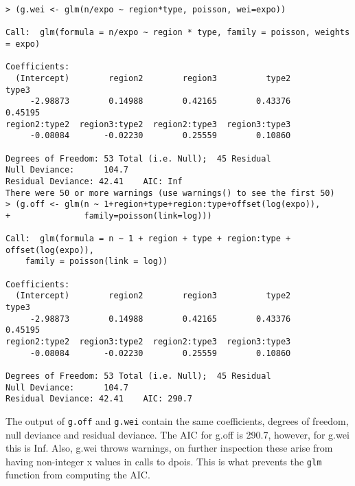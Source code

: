 \documentclass[11pt]{article}
\begin{document}
\begin{verbatim}
> (g.wei <- glm(n/expo ~ region*type, poisson, wei=expo))

Call:  glm(formula = n/expo ~ region * type, family = poisson, weights = expo)

Coefficients:
  (Intercept)        region2        region3          type2          type3
     -2.98873        0.14988        0.42165        0.43376        0.45195
region2:type2  region3:type2  region2:type3  region3:type3  
     -0.08084       -0.02230        0.25559        0.10860  

Degrees of Freedom: 53 Total (i.e. Null);  45 Residual
Null Deviance:	    104.7 
Residual Deviance: 42.41 	AIC: Inf
There were 50 or more warnings (use warnings() to see the first 50)
> (g.off <- glm(n ~ 1+region+type+region:type+offset(log(expo)),
+               family=poisson(link=log)))

Call:  glm(formula = n ~ 1 + region + type + region:type + offset(log(expo)), 
    family = poisson(link = log))

Coefficients:
  (Intercept)        region2        region3          type2          type3
     -2.98873        0.14988        0.42165        0.43376        0.45195
region2:type2  region3:type2  region2:type3  region3:type3  
     -0.08084       -0.02230        0.25559        0.10860  

Degrees of Freedom: 53 Total (i.e. Null);  45 Residual
Null Deviance:	    104.7 
Residual Deviance: 42.41 	AIC: 290.7
\end{verbatim}

The output of \verb|g.off| and \verb|g.wei| contain the same coefficients, degrees of freedom, null deviance and residual deviance.
The AIC for g.off is 290.7, however, for g.wei this is Inf. Also, g.wei throws warnings, on further inspection these arise from having non-integer x values in calls to dpois. This is what prevents the \verb|glm| function from computing the AIC.
\end{document}

